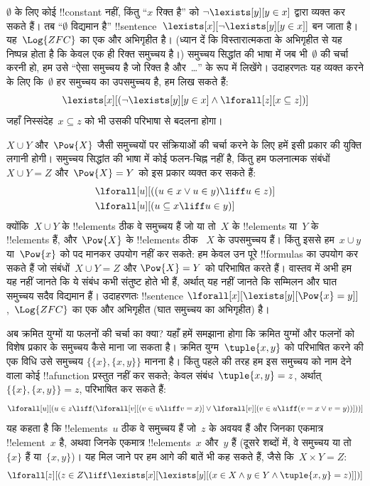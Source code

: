 \documentclass[../../../include/open-logic-section]{subfiles}
\begin{document}
$\emptyset$ के लिए कोई !!{constant} नहीं, किंतु ``$x$ रिक्त है'' को
$\lnot \lexists[y][y \in x]$ द्वारा व्यक्त कर सकते हैं। तब ``$\emptyset$
विद्यमान है'' !!{sentence}~$\lexists[x][\lnot \lexists[y][y \in
    x]]$ बन
जाता है। यह~$\Log{ZFC}$ का एक और अभिगृहीत है। (ध्यान दें कि विस्तारात्मकता
के अभिगृहीत से यह निष्पन्न होता है कि केवल एक ही रिक्त समुच्चय है।) समुच्चय
सिद्धांत की भाषा में जब भी~$\emptyset$ की चर्चा करनी हो, हम उसे ``ऐसा समुच्चय
है जो रिक्त है और~\dots'' के रूप में लिखेंगे। उदाहरणतः यह व्यक्त करने के लिए
कि~$\emptyset$ हर समुच्चय का उपसमुच्चय है, हम लिख सकते हैं:
\[
\lexists[x][(\lnot\lexists[y][y \in x] \land \lforall[z][x \subseteq
    z])]
\]
जहाँ निस्संदेह~$x \subseteq z$ को भी उसकी परिभाषा से बदलना होगा।

$X \cup Y$ और~$\Pow{X}$ जैसी समुच्चयों पर संक्रियाओं की चर्चा करने के लिए
हमें इसी प्रकार की युक्ति लगानी होगी। समुच्चय सिद्धांत की भाषा में कोई
फलन-चिह्न नहीं है, किंतु हम फलनात्मक संबंधों~$X
\cup Y = Z$ और~$\Pow{X} = Y$
को इस प्रकार व्यक्त कर सकते हैं:
\begin{align*}
& \lforall[u][((u \in x \lor u \in y) \liff u \in z)]\\
& \lforall[u][(u \subseteq x \liff u \in y )]
\end{align*}
क्योंकि~$X \cup Y$ के !!{element}s ठीक वे समुच्चय हैं जो या तो~$X$ के
!!{element}s या~$Y$ के !!{element}s हैं, और~$\Pow{X}$ के !!{element}s ठीक
~$X$ के उपसमुच्चय हैं।
किंतु इससे हम~$x \cup y$ या~$\Pow{x}$ को पद मानकर उपयोग नहीं कर सकते: हम
केवल उन पूरे !!{formula}s का उपयोग कर सकते हैं जो संबंधों~$X \cup Y = Z$ और
$\Pow{X} = Y$ को परिभाषित करते हैं। वास्तव में अभी हम यह नहीं जानते कि ये
संबंध कभी संतुष्ट होते भी हैं, अर्थात् यह नहीं जानते कि सम्मिलन और घात
समुच्चय सदैव विद्यमान हैं। उदाहरणतः !!{sentence}
$\lforall[x][\lexists[y][\Pow{x} = y]]$,~$\Log{ZFC}$ का एक और अभिगृहीत
(घात समुच्चय का अभिगृहीत) है।

अब क्रमित युग्मों या फलनों की चर्चा का क्या? यहाँ हमें समझाना होगा कि क्रमित
युग्मों और फलनों को विशेष प्रकार के समुच्चय कैसे माना जा सकता है। क्रमित
युग्म~$\tuple{x, y}$ को परिभाषित करने की एक विधि उसे समुच्चय
$\{\{x\}, \{x, y\}\}$ मानना है। किंतु पहले की तरह हम इस समुच्चय को नाम देने
वाला कोई !!a{function} प्रस्तुत नहीं कर सकते; केवल संबंध~$\tuple{x, y} = z$,
अर्थात्~$\{\{x\}, \{x, y\}\} = z$, परिभाषित कर सकते हैं:
\[
\lforall[u][(u \in z \liff (\lforall[v][(v \in u \liff v = x)] \lor
  \lforall[v][(v \in u \liff (v = x \lor v = y))]))]
\]
यह कहता है कि !!{element}s~$u$ ठीक वे समुच्चय हैं जो~$z$ के अवयव हैं और जिनका एकमात्र
!!{element}~$x$ है, अथवा जिनके एकमात्र !!{element}s~$x$ और~$y$ हैं (दूसरे
शब्दों में, वे समुच्चय या तो~$\{x\}$ हैं या~$\{x, y\}$)। यह
मिल जाने पर हम आगे की बातें भी कह सकते हैं, जैसे कि~$X \times Y = Z$:
\[
\lforall[z][(z \in Z \liff \lexists[x][\lexists[y][(x \in
        X \land y \in Y \land \tuple{x, y} = z)]])]
\]
\end{document}
